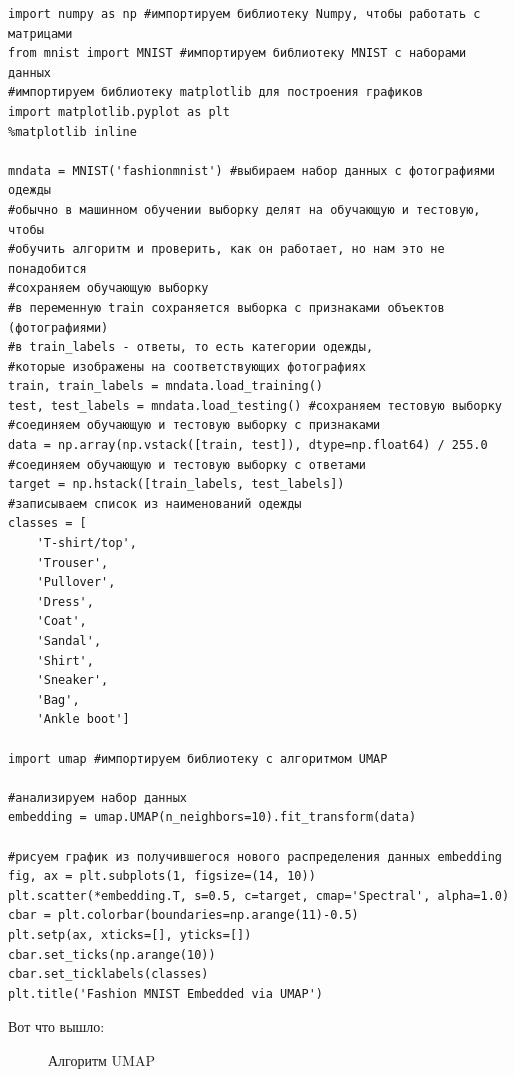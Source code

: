 \begin{itemize}
	\begin{verbatim}
import numpy as np #импортируем библиотеку Numpy, чтобы работать с матрицами
from mnist import MNIST #импортируем библиотеку MNIST с наборами данных
#импортируем библиотеку matplotlib для построения графиков
import matplotlib.pyplot as plt
%matplotlib inline
		
mndata = MNIST('fashionmnist') #выбираем набор данных с фотографиями одежды
#обычно в машинном обучении выборку делят на обучающую и тестовую, чтобы
#обучить алгоритм и проверить, как он работает, но нам это не понадобится
#сохраняем обучающую выборку
#в переменную train сохраняется выборка с признаками объектов (фотографиями)
#в train_labels - ответы, то есть категории одежды,
#которые изображены на соответствующих фотографиях
train, train_labels = mndata.load_training() 
test, test_labels = mndata.load_testing() #сохраняем тестовую выборку
#соединяем обучающую и тестовую выборку с признаками
data = np.array(np.vstack([train, test]), dtype=np.float64) / 255.0
#соединяем обучающую и тестовую выборку с ответами
target = np.hstack([train_labels, test_labels])
#записываем список из наименований одежды
classes = [
	'T-shirt/top',
	'Trouser',
	'Pullover',
	'Dress',
	'Coat',
	'Sandal',
	'Shirt',
	'Sneaker',
	'Bag',
	'Ankle boot']
			
import umap #импортируем библиотеку с алгоритмом UMAP

#анализируем набор данных
embedding = umap.UMAP(n_neighbors=10).fit_transform(data)
		
#рисуем график из получившегося нового распределения данных embedding
fig, ax = plt.subplots(1, figsize=(14, 10))
plt.scatter(*embedding.T, s=0.5, c=target, cmap='Spectral', alpha=1.0)
cbar = plt.colorbar(boundaries=np.arange(11)-0.5)
plt.setp(ax, xticks=[], yticks=[])
cbar.set_ticks(np.arange(10))
cbar.set_ticklabels(classes)
plt.title('Fashion MNIST Embedded via UMAP')
	\end{verbatim}

Вот что вышло:

\begin{figure}[bh]
	\noindent{}
	\caption{Алгоритм UMAP}
	\label{figCurves}
\end{figure}


\end{itemize}
